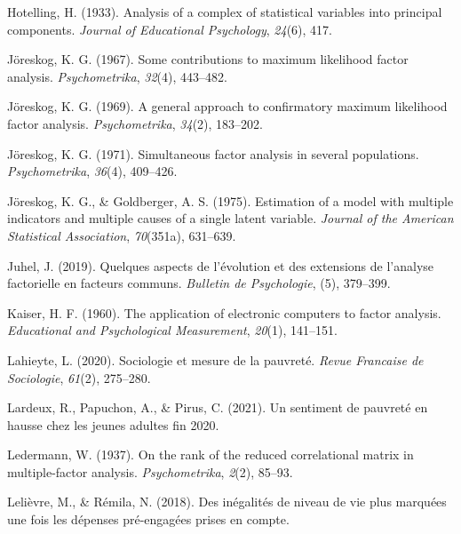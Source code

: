 \documentclass[12pt,a4paper]{reedthesis}
\newenvironment{CSLReferences}%
  {}%
  {\par}
\begin{document}
\begin{CSLReferences}{1}{0}
\leavevmode\hypertarget{ref-hotelling1933analysis}{}%
Hotelling, H. (1933). Analysis of a complex of statistical variables into principal components. \emph{Journal of Educational Psychology}, \emph{24}(6), 417.

\leavevmode\hypertarget{ref-joreskog1967some}{}%
Jöreskog, K. G. (1967). Some contributions to maximum likelihood factor analysis. \emph{Psychometrika}, \emph{32}(4), 443--482.

\leavevmode\hypertarget{ref-joreskog1969general}{}%
Jöreskog, K. G. (1969). A general approach to confirmatory maximum likelihood factor analysis. \emph{Psychometrika}, \emph{34}(2), 183--202.

\leavevmode\hypertarget{ref-joreskog1971simultaneous}{}%
Jöreskog, K. G. (1971). Simultaneous factor analysis in several populations. \emph{Psychometrika}, \emph{36}(4), 409--426.

\leavevmode\hypertarget{ref-joreskog1975estimation}{}%
Jöreskog, K. G., \& Goldberger, A. S. (1975). Estimation of a model with multiple indicators and multiple causes of a single latent variable. \emph{Journal of the American Statistical Association}, \emph{70}(351a), 631--639.

\leavevmode\hypertarget{ref-juhel2019quelques}{}%
Juhel, J. (2019). Quelques aspects de l'{é}volution et des extensions de l'analyse factorielle en facteurs communs. \emph{Bulletin de Psychologie}, (5), 379--399.

\leavevmode\hypertarget{ref-kaiser1960application}{}%
Kaiser, H. F. (1960). The application of electronic computers to factor analysis. \emph{Educational and Psychological Measurement}, \emph{20}(1), 141--151.

\leavevmode\hypertarget{ref-lahieyte2020sociologie}{}%
Lahieyte, L. (2020). Sociologie et mesure de la pauvret{é}. \emph{Revue Francaise de Sociologie}, \emph{61}(2), 275--280.

\leavevmode\hypertarget{ref-lardeux2021sentiment}{}%
Lardeux, R., Papuchon, A., \& Pirus, C. (2021). Un sentiment de pauvreté en hausse chez les jeunes adultes fin 2020.

\leavevmode\hypertarget{ref-ledermann1937rank}{}%
Ledermann, W. (1937). On the rank of the reduced correlational matrix in multiple-factor analysis. \emph{Psychometrika}, \emph{2}(2), 85--93.

\leavevmode\hypertarget{ref-lelievre2018inegalites}{}%
Lelièvre, M., \& Rémila, N. (2018). Des in{é}galit{é}s de niveau de vie plus marqu{é}es une fois les d{é}penses pr{é}-engag{é}es prises en compte.


\end{CSLReferences}
\end{document}
